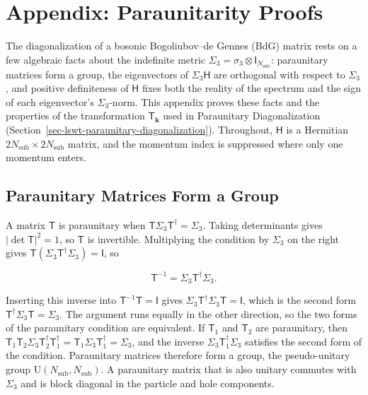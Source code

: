 
\hypertarget{sec-lswt-paraunitarity-proofs}{%
\section{Appendix: Paraunitarity Proofs}\label{sec-lswt-paraunitarity-proofs}}

The diagonalization of a bosonic Bogoliubov--de Gennes (BdG) matrix rests on a few algebraic facts about the indefinite metric \(\Sigma_3=\sigma_3\otimes\mathsf I_{N_{\mathrm{sub}}}\): paraunitary matrices form a group, the eigenvectors of \(\Sigma_3\mathsf H\) are orthogonal with respect to \(\Sigma_3\), and positive definiteness of \(\mathsf H\) fixes both the reality of the spectrum and the sign of each eigenvector's \(\Sigma_3\)-norm. This appendix proves these facts and the properties of the transformation \(\mathsf T_{\mathbf k}\) used in Paraunitary Diagonalization (Section~\ref{sec-lswt-paraunitary-diagonalization}). Throughout, \(\mathsf H\) is a Hermitian \(2N_{\mathrm{sub}}\times2N_{\mathrm{sub}}\) matrix, and the momentum index is suppressed where only one momentum enters.

\subsection{Paraunitary Matrices Form a Group}

A matrix \(\mathsf T\) is paraunitary when \(\mathsf T\Sigma_3\mathsf T^\dagger=\Sigma_3\). Taking determinants gives \(|\det\mathsf T|^2=1\), so \(\mathsf T\) is invertible. Multiplying the condition by \(\Sigma_3\) on the right gives \(\mathsf T(\Sigma_3\mathsf T^\dagger\Sigma_3)=\mathsf I\), so

\[
\mathsf T^{-1}=\Sigma_3\mathsf T^\dagger\Sigma_3.
\]

Inserting this inverse into \(\mathsf T^{-1}\mathsf T=\mathsf I\) gives \(\Sigma_3\mathsf T^\dagger\Sigma_3\mathsf T=\mathsf I\), which is the second form \(\mathsf T^\dagger\Sigma_3\mathsf T=\Sigma_3\). The argument runs equally in the other direction, so the two forms of the paraunitary condition are equivalent. If \(\mathsf T_1\) and \(\mathsf T_2\) are paraunitary, then \(\mathsf T_1\mathsf T_2\Sigma_3\mathsf T_2^\dagger\mathsf T_1^\dagger=\mathsf T_1\Sigma_3\mathsf T_1^\dagger=\Sigma_3\), and the inverse \(\Sigma_3\mathsf T_1^\dagger\Sigma_3\) satisfies the second form of the condition. Paraunitary matrices therefore form a group, the pseudo-unitary group \(\mathrm U(N_{\mathrm{sub}},N_{\mathrm{sub}})\). A paraunitary matrix that is also unitary commutes with \(\Sigma_3\) and is block diagonal in the particle and hole components.

